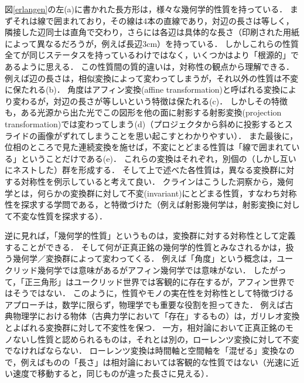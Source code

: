 \documentclass[11pt,a4paper, dvipdfmx]{jsarticle}
\begin{document}
図\ref{erlangen}の左(a)に書かれた長方形は，様々な幾何学的性質を持っている．
まずそれは線で囲まれており，その線は4本の直線であり，対辺の長さは等しく，隣接した辺同士は直角で交わり，さらには各辺は具体的な長さ（印刷された用紙によって異なるだろうが，例えば長辺3cm）を持っている．
しかしこれらの性質全てが同じステータスを持っているわけではなく，いくつかはより「根源的」であるように思える．
この性質間の質的違いは，対称性の観点から理解できる．
例えば辺の長さは，相似変換によって変わってしまうが，それ以外の性質は不変に保たれる(b)．
角度はアフィン変換(affine transformation)と呼ばれる変換により変わるが，対辺の長さが等しいという特徴は保たれる(c)．
しかしその特徴も，ある光源から出た光でこの図形を他の面に射影する射影変換(projection transformation)では変わってしまう(d)（プロジェクタから斜めに投影するとスライドの画像がずれてしまうことを思い起こすとわかりやすい）．
また最後に，位相のところで見た連続変換を施せば，不変にとどまる性質は「線で囲まれている」ということだけである(e)．
これらの変換はそれぞれ，別個の（しかし互いにネストした）群を形成する．
そして上で述べた各性質は，異なる変換群に対する対称性を例示していると考えて良い．
クラインはこうした洞察から，幾何学とは，何らかの変換群に対して不変(invariant)にとどまる性質，すなわち対称性を探求する学問である，と特徴づけた（例えば射影幾何学は，射影変換に対して不変な性質を探求する）．

逆に見れば，「幾何学的性質」というものは，変換群に対する対称性として定義することができる．
そして何が正真正銘の幾何学的性質とみなされるかは，扱う幾何学／変換群によって変わってくる．
例えば「角度」という概念は，ユークリッド幾何学では意味があるがアフィン幾何学では意味がない．
したがって，「正三角形」はユークリッド世界では客観的に存在するが，アフィン世界ではそうではない．
このように，性質やモノの実在性を対称性として特徴づけるアプローチは，数学に限らず，物理学でも重要な役割を担ってきた．
例えば古典物理学における物体（古典力学において「存在」するもの）は，ガリレオ変換とよばれる変換群に対して不変性を保つ．
一方，相対論において正真正銘のモノないし性質と認められるものは，それとは別の，ローレンツ変換に対して不変でなければならない．
ローレンツ変換は時間軸と空間軸を「混ぜる」変換なので，例えばものの「長さ」は相対論においては客観的な性質ではない（光速に近い速度で移動すると，同じものが違った長さに見える）．
\end{document}

